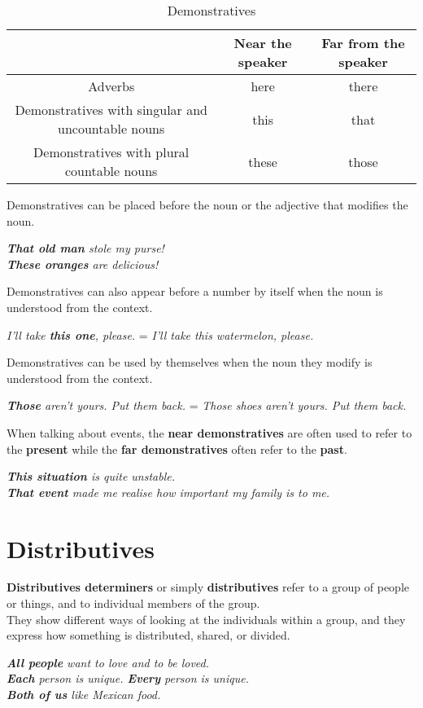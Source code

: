 \documentclass[hidelinks,10pt,a4paper]{article}
\begin{document}
\begin{table}[h]
\begin{center}
\begin{tabular}{|c|c|c|}
		\hline
		     	 & \textbf{Near the speaker} & \textbf{Far from the speaker} \\ \hline
		Adverbs  & here & there \\ \hline
		Demonstratives with singular and uncountable nouns & this & that \\ \hline
		Demonstratives with plural countable nouns & these & those\\ \hline
\end{tabular}
\end{center}
\caption{\label{tab:nouns7}Demonstratives}
\end{table}
Demonstratives can be placed before the noun or the adjective that modifies the noun.
\begin{center}
\textit{ \textbf{That old man} stole my purse!\\
\textbf{These oranges} are delicious!}
\end{center}
Demonstratives can also appear before a number by itself when the noun is understood from the context.
\begin{center}
\textit{I'll take \textbf{this one}, please.} = \textit{I'll take this watermelon, please.}
\end{center}
Demonstratives can be used by themselves when the noun they modify is understood from the context.
\begin{center}
\textit{ \textbf{Those} aren't yours. Put them back.} = \textit{Those shoes aren't yours. Put them back.}
\end{center}
When talking about events, the \textbf{near demonstratives} are often used to refer to the \textbf{present} while the \textbf{far demonstratives} often refer to the \textbf{past}.
\begin{center}
\textit{ \textbf{This situation} is quite unstable. \\
\textbf{That event} made me realise how important my family is to me.}
\end{center}

\section{Distributives}
\textbf{Distributives determiners} or simply \textbf{distributives} refer to a group of people or things, and to individual members of the group.\\
\indent They show different ways of looking at the individuals within a group, and they express how something is distributed, shared, or divided.
\begin{center}
\textit{ \textbf{All people} want to love and to be loved.\\
\textbf{Each} person is unique. \textbf{Every} person is unique.\\
\textbf{Both of us} like Mexican food.}
\end{center}
\end{document}
